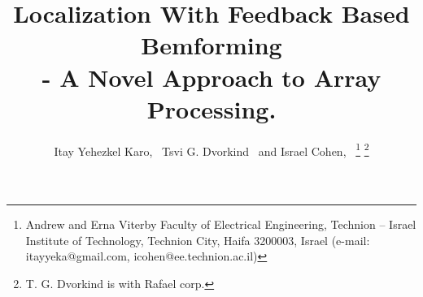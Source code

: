 \documentclass[journal]{IEEEtran}
\begin{document}
%
\title{Localization With Feedback Based Bemforming \\- A Novel Approach to Array Processing.}
%
%
%

\author{Itay Yehezkel Karo,~\IEEEmembership{}
        Tsvi G. Dvorkind~\IEEEmembership{}
        and 
        Israel Cohen,~
\thanks{Andrew and Erna Viterby Faculty of Electrical Engineering, Technion -- Israel Institute of Technology, Technion City, Haifa 3200003, Israel (e-mail: itayyeka@gmail.com, icohen@ee.technion.ac.il)}%
\thanks{T. G. Dvorkind is with Rafael corp.}%
}

% 
%
\end{document}
